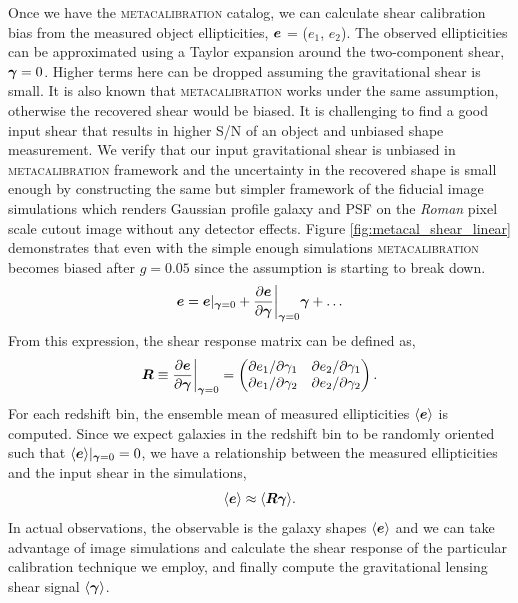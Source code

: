 \documentclass[fleqn,usenatbib]{mnras}
\begin{document}
Once we have the \textsc{metacalibration} catalog, we can calculate shear calibration bias from the measured object ellipticities, $\vb*{e}$ = ($e_{1}$, $e_{2}$). The observed ellipticities can be approximated using a Taylor expansion around the two-component shear, $\vb*{\gamma}=0$. Higher terms here can be dropped assuming the gravitational shear is small. It is also known that \textsc{metacalibration} works under the same assumption, otherwise the recovered shear would be biased. It is challenging to find a good input shear that results in higher S/N of an object and unbiased shape measurement. We verify that our input gravitational shear is unbiased in \textsc{metacalibration} framework and the uncertainty in the recovered shape is small enough by constructing the same but simpler framework of the fiducial image simulations which renders Gaussian profile galaxy and PSF on the \emph{Roman} pixel scale cutout image without any detector effects. Figure \ref{fig:metacal_shear_linear} demonstrates that even with the simple enough simulations \textsc{metacalibration} becomes biased after $g=0.05$ since the assumption is starting to break down. 
\begin{equation}
    \vb*{e} = \vb*{e}\rvert_{\vb*{\gamma}=0} + \frac{\partial \vb*{e}}{\partial \vb*{\gamma}}\bigg\rvert_{\vb*{\gamma}=0}\vb*{\gamma} + \ldots
\end{equation}
From this expression, the shear response matrix can be defined as, 
\begin{equation}
    \vb*{R} \equiv \frac{\partial \vb*{e}}{\partial \vb*{\gamma}}\bigg\rvert_{\vb*{\gamma}=0} = 
    \begin{pmatrix}
        \partial e_{1}/\partial \gamma_{1} & \partial e_{2}/\partial \gamma_{1} \\ 
        \partial e_{1}/\partial \gamma_{2} & \partial e_{2}/\partial \gamma_{2}
    \end{pmatrix}. 
\end{equation}
For each redshift bin, the ensemble mean of measured ellipticities $\langle\vb*{e}\rangle$ is computed. Since we expect galaxies in the redshift bin to be randomly oriented such that $\langle\vb*{e}\rangle\rvert_{\vb*{\gamma}=0}=0$, we have a relationship between the measured ellipticities and the input shear in the simulations, 
\begin{equation}
    \langle\vb*{e}\rangle \approx \langle \vb*{R}\vb*{\gamma} \rangle. 
\end{equation} 
In actual observations, the observable is the galaxy shapes $\langle\vb*{e}\rangle$ and we can take advantage of image simulations and calculate the shear response of the particular calibration technique we employ, and finally compute the gravitational lensing shear signal $\langle\vb*{\gamma}\rangle$. 
\end{document}
